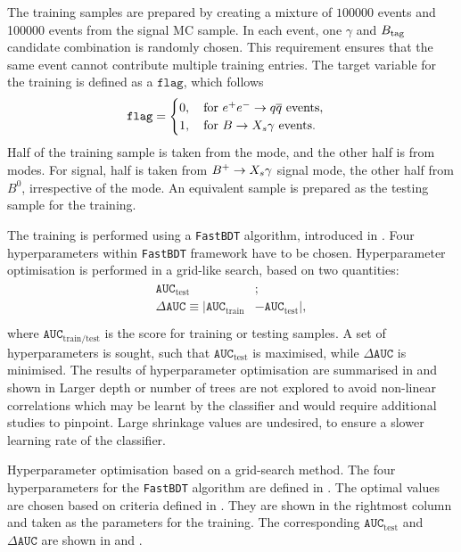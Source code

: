 The training samples are prepared by creating a mixture of $100000$ \epem\ra\qqbar events and 100000 \BtoXsgamma events from the signal MC sample.
In each event, one $\gamma$ and $B_{\mathrm{tag}}$ candidate combination is randomly chosen.
This requirement ensures that the same event cannot contribute multiple training entries.
The target variable for the training is defined as a $\mathtt{flag}$, which follows
\begin{equation}
    \mathtt{flag}=\begin{cases}
      0,\quad \mathrm{for}~\epem\ra\qqbar~\mathrm{events},\\ 
      1,\quad \mathrm{for}~\BtoXsgamma~\mathrm{events}.
      \end{cases}
\end{equation}
Half of the \epem\ra\qqbar training sample is taken from the \feiBp mode, and the other half is from \feiBz modes. 
For signal, half is taken from $\BptoXsgamma$ signal mode, the other half from $B^0$, irrespective of the \FEI mode.
An equivalent sample is prepared as the testing sample for the training.

The training is performed using a \texttt{FastBDT} algorithm, introduced in .
Four hyperparameters within \texttt{FastBDT} framework have to be chosen.
Hyperparameter optimisation is performed in a grid-like search, based on two quantities:
\begin{align}\label{eq:optimisation_criteria}
    \begin{split}
    \mathtt{AUC}_{\mathrm{test}}&;\\
    \Delta \mathtt{AUC} \equiv |\mathtt{AUC}_{\mathrm{train}}& - \mathtt{AUC}_{\mathrm{test}}|,\\
    \end{split}
\end{align}
where $\mathtt{AUC}_{\mathrm{train}/\mathrm{test}}$ is the \AUC score for training or testing samples.
A set of hyperparameters is sought, such that $ \mathtt{AUC}_{\mathrm{test}}$ is maximised, while $\Delta \mathtt{AUC}$ is minimised.
The results of hyperparameter optimisation are summarised in  and shown in 
Larger depth or number of trees are not explored to avoid non-linear correlations which may be learnt by the classifier and would require additional studies to pinpoint.
Large shrinkage values are undesired, to ensure a slower learning rate of the classifier.

\begin{table}[htbp!]
    \centering
    \caption{\label{tab:grid_search}Hyperparameter optimisation based on a grid-search method.
    The four hyperparameters for the \texttt{FastBDT} algorithm are defined in .
    The optimal values are chosen based on criteria defined in .
    They are shown in the rightmost column and taken as the parameters for the training.
    The corresponding $\mathtt{AUC}_{\mathrm{test}}$ and $\Delta \mathtt{AUC}$ are shown in  and .
    }
    
\end{table}

